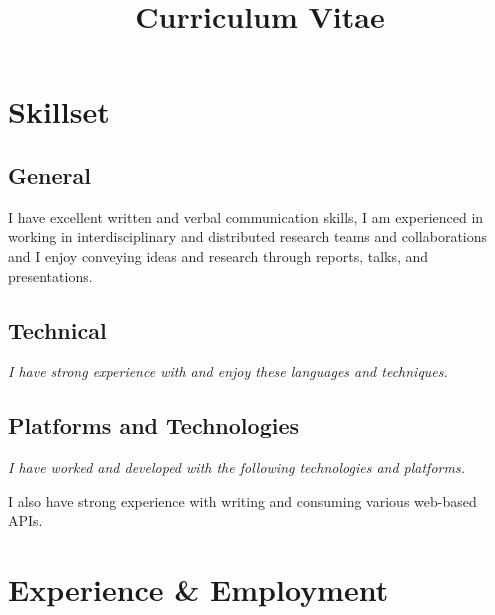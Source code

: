 \documentclass[11pt,a4paper,sans]{moderncv} %
\title{Curriculum Vitae}
\begin{document}
\makecvtitle



\section{Skillset}
	\subsection{General}
    \hspace{2.5cm}\parbox[b][3em][t]{0.8\textwidth}{I have excellent written and verbal communication skills, I am experienced in working in interdisciplinary and distributed research teams and collaborations and I enjoy conveying ideas and research through reports, talks, and presentations.}

	\subsection{Technical}
		\hspace{2.5cm}\textit{I have strong experience with and enjoy these languages and techniques.}\\

	\subsection{Platforms and Technologies}
		\hspace{2.5cm}\textit{I have worked and developed with the following technologies and platforms.}\\

    I also have strong experience with writing and consuming various web-based APIs.

	

\section{Experience \& Employment}
\end{document}
